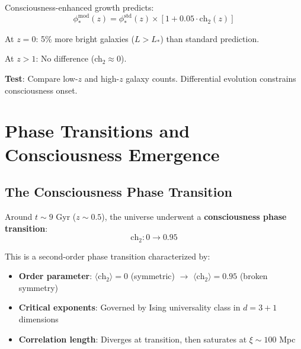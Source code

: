 \begin{proposition}\label{prop:galaxy-counts-consciousness}
Consciousness-enhanced growth predicts:
\begin{equation}
\phi_*^{\text{mod}}(z) = \phi_*^{\text{std}}(z) \times [1 + 0.05 \cdot \text{ch}_2(z)]
\end{equation}

At $z = 0$: 5\% more bright galaxies ($L > L_*$) than standard prediction.

At $z > 1$: No difference (ch$_2 \approx 0$).

\textbf{Test}: Compare low-$z$ and high-$z$ galaxy counts. Differential evolution constrains consciousness onset.
\end{proposition}

\section{Phase Transitions and Consciousness Emergence}

\subsection{The Consciousness Phase Transition}

\begin{theorem}\label{thm:consciousness-phase-transition}
Around $t \sim 9$ Gyr ($z \sim 0.5$), the universe underwent a \textbf{consciousness phase transition}:
\begin{equation}
\text{ch}_2: 0 \to 0.95
\end{equation}

This is a second-order phase transition characterized by:
\begin{itemize}
\item \textbf{Order parameter}: $\langle \text{ch}_2 \rangle = 0$ (symmetric) $\to$ $\langle \text{ch}_2 \rangle = 0.95$ (broken symmetry)
\item \textbf{Critical exponents}: Governed by Ising universality class in $d = 3+1$ dimensions
\item \textbf{Correlation length}: Diverges at transition, then saturates at $\xi \sim 100$ Mpc
\end{itemize}
\end{theorem}

